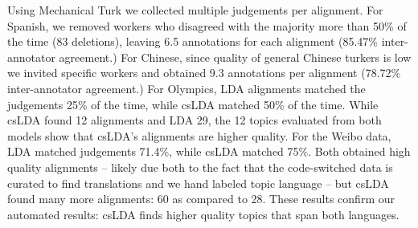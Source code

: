 \documentclass[11pt]{article}
\begin{document}
Using Mechanical Turk we collected multiple judgements per alignment.
For Spanish, we removed workers who disagreed with the majority more than 50\% of the time (83 deletions),
leaving 6.5 annotations for each alignment (85.47\% inter-annotator agreement.)
For Chinese, since quality of general Chinese turkers is low \cite{Pavlick-EtAl-2014:TACL}
we invited specific workers and obtained 9.3 annotations per alignment (78.72\% inter-annotator agreement.)
For Olympics, LDA alignments matched the judgements 25\% of the time, while csLDA matched 50\% of the time.
While csLDA found 12 alignments and LDA 29, the 12 topics evaluated from both models show that csLDA's alignments
are higher quality.
For the Weibo data, LDA matched judgements 71.4\%, while csLDA matched 75\%. Both obtained high quality alignments --
likely due both to the fact that the code-switched data is curated to find translations and we hand labeled topic language --
but csLDA found many more alignments: 60 as compared to 28. These results confirm our automated results: csLDA finds higher 
quality topics that span both languages.



\end{document}

